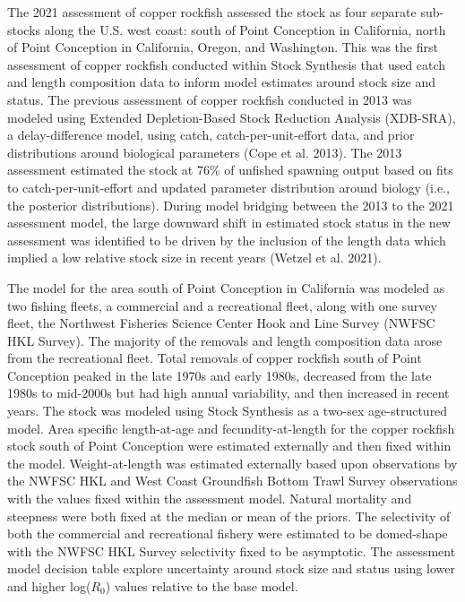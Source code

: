 \documentclass[11pt,
  english,
  a4paper,
]{article}
\begin{document}
The 2021 assessment of copper rockfish assessed the stock as four separate sub-stocks along the U.S. west coast: south of Point Conception in California, north of Point Conception in California, Oregon, and Washington. This was the first assessment of copper rockfish conducted within Stock Synthesis that used catch and length composition data to inform model estimates around stock size and status. The previous assessment of copper rockfish conducted in 2013 was modeled using Extended Depletion-Based Stock Reduction Analysis (XDB-SRA), a delay-difference model, using catch, catch-per-unit-effort data, and prior distributions around biological parameters {(Cope et al. 2013)\leavevmode\tagmcend\tagstructend}. The 2013 assessment estimated the stock at 76\% of unfished spawning output based on fits to catch-per-unit-effort and updated parameter distribution around biology (i.e., the posterior distributions). During model bridging between the 2013 to the 2021 assessment model, the large downward shift in estimated stock status in the new assessment was identified to be driven by the inclusion of the length data which implied a low relative stock size in recent years {(Wetzel et al. 2021)\leavevmode\tagmcend\tagstructend}.

\leavevmode\tagmcend\tagstructend\par


The model for the area south of Point Conception in California was modeled as two fishing fleets, a commercial and a recreational fleet, along with one survey fleet, the Northwest Fisheries Science Center Hook and Line Survey (NWFSC HKL Survey). The majority of the removals and length composition data arose from the recreational fleet. Total removals of copper rockfish south of Point Conception peaked in the late 1970s and early 1980s, decreased from the late 1980s to mid-2000s but had high annual variability, and then increased in recent years. The stock was modeled using Stock Synthesis as a two-sex age-structured model. Area specific length-at-age and fecundity-at-length for the copper rockfish stock south of Point Conception were estimated externally and then fixed within the model. Weight-at-length was estimated externally based upon observations by the NWFSC HKL and West Coast Groundfish Bottom Trawl Survey observations with the values fixed within the assessment model. Natural mortality and steepness were both fixed at the median or mean of the priors. The selectivity of both the commercial and recreational fishery were estimated to be domed-shape with the NWFSC HKL Survey selectivity fixed to be asymptotic. The assessment model decision table explore uncertainty around stock size and status using lower and higher log({\(R_0\)\leavevmode\tagmcend\tagstructend}) values relative to the base model.
\end{document}
